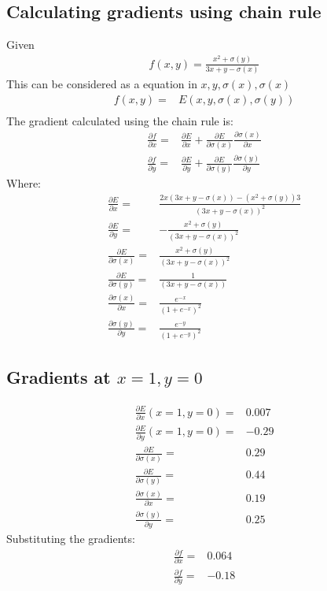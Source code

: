 \documentclass{article}
\begin{document}
\subsection{Calculating gradients using chain rule}
Given
\begin{align*}
  f(x,y) = \frac{x^{2} + \sigma{(y)}}{3x + y - \sigma{(x)}}
\end{align*}
This can be considered as a equation in $x, y, \sigma{(x)}, \sigma{(x)}$
\begin{align*}
  f(x,y)=& E(x,y,\sigma(x),\sigma(y)) \\
\end{align*}
The gradient calculated using the chain rule is:
\begin{align*}
  \frac{\partial f}{\partial x}=& \frac{\partial E}{\partial x}+  \frac{\partial E}{\partial \sigma (x)}  \frac{\partial  \sigma (x)}{\partial x}\\
  \frac{\partial f}{\partial y}=& \frac{\partial E}{\partial y}+  \frac{\partial E}{\partial \sigma (y)}  \frac{\partial  \sigma (y)}{\partial y}
\end{align*}
Where:
\begin{align*}
  \frac{\partial E}{\partial x}=& \frac{2x(3x+y-\sigma{(x)})-(x^2+\sigma{(y)})3}{{(3x+y-\sigma{(x)})}^2}\\
  \frac{\partial E}{\partial y}=& -\frac{x^2+\sigma(y)}{{(3x+y-\sigma(x))}^2}\\
  \frac{\partial E}{\partial \sigma (x)}=& \frac{x^2+\sigma (y)}{{(3x+y-\sigma(x))}^2}\\
  \frac{\partial E}{\partial \sigma (y)} =& \frac{1}{(3x+y-\sigma(x))}\\
  \frac{\partial  \sigma(x)}{\partial x}=&\frac{e^{-x}}{{(1+e^{-x})}^2}\\
  \frac{\partial  \sigma(y)}{\partial y}=&\frac{e^{-y}}{{(1+e^{-y})}^2}
\end{align*}

\subsection{Gradients at $x = 1, y = 0$}
\begin{align*}
  \frac{\partial E}{\partial x}(x=1,y=0)=& 0.007\\
  \frac{\partial E}{\partial y}(x=1,y=0)=&-0.29\\
  \frac{\partial E}{\partial \sigma (x)}=& 0.29\\
  \frac{\partial E}{\partial \sigma (y)} =& 0.44\\
  \frac{\partial  \sigma (x)}{\partial x}=&0.19\\
  \frac{\partial  \sigma (y)}{\partial y}=&0.25
\end{align*}
Substituting the gradients:
\begin{align*}
  \frac{\partial f}{\partial x}=& 0.064\\
  \frac{\partial f}{\partial y}=& -0.18 
\end{align*}
\end{document}
